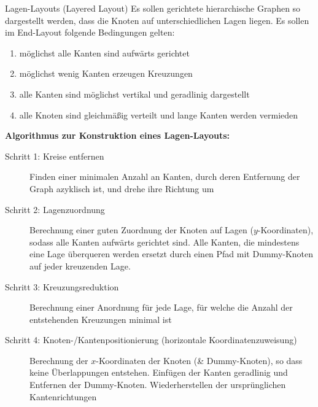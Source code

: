 \begin{TOP}{Lagen-Layouts (Layered Layout)}
Es sollen gerichtete hierarchische Graphen so dargestellt werden, dass die Knoten auf unterschiedlichen Lagen liegen. Es sollen im End-Layout folgende Bedingungen gelten:
	\begin{enumerate}[itemsep=-1pt]
		\item möglichst alle Kanten sind aufwärts gerichtet
		\item möglichst wenig Kanten erzeugen Kreuzungen
		\item alle Kanten sind möglichst vertikal und geradlinig dargestellt
		\item alle Knoten sind gleichmäßig verteilt und lange Kanten werden vermieden
	\end{enumerate}
{\Large{\textbf{Algorithmus zur Konstruktion eines Lagen-Layouts:}}}
\begin{description}
	\item[Schritt 1: Kreise entfernen] Finden einer minimalen Anzahl an Kanten, durch deren Entfernung der Graph azyklisch ist, und drehe ihre Richtung um
	\item[Schritt 2: Lagenzuordnung] Berechnung einer guten Zuordnung der Knoten auf Lagen ($y$-Koordinaten), sodass alle Kanten aufwärts gerichtet sind. Alle Kanten, die mindestens eine Lage überqueren werden ersetzt durch einen Pfad mit Dummy-Knoten auf jeder kreuzenden Lage.
	\item[Schritt 3: Kreuzungsreduktion] Berechnung einer Anordnung für jede Lage, für welche die Anzahl der entstehenden Kreuzungen minimal ist
	\item[Schritt 4: Knoten-/Kantenpositionierung (horizontale Koordinatenzuweisung)] Berechnung der $x$-Koordinaten der Knoten (\& Dummy-Knoten), so dass keine Überlappungen entstehen. Einfügen der Kanten geradlinig und Entfernen der Dummy-Knoten. Wiederherstellen der ursprünglichen Kantenrichtungen
\end{description}
\end{TOP}
